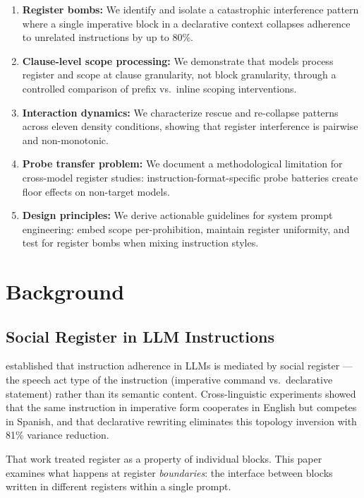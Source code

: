 \documentclass[11pt,a4paper]{article}
\begin{document}
\begin{enumerate}[leftmargin=*]
\item \textbf{Register bombs:} We identify and isolate a catastrophic
interference pattern where a single imperative block in a declarative
context collapses adherence to unrelated instructions by up to 80\%.

\item \textbf{Clause-level scope processing:} We demonstrate that
models process register and scope at clause granularity, not block
granularity, through a controlled comparison of prefix vs.\ inline
scoping interventions.

\item \textbf{Interaction dynamics:} We characterize rescue and
re-collapse patterns across eleven density conditions, showing that
register interference is pairwise and non-monotonic.

\item \textbf{Probe transfer problem:} We document a methodological
limitation for cross-model register studies: instruction-format-specific
probe batteries create floor effects on non-target models.

\item \textbf{Design principles:} We derive actionable guidelines for
system prompt engineering: embed scope per-prohibition, maintain register
uniformity, and test for register bombs when mixing instruction styles.
\end{enumerate}

\section{Background}

\subsection{Social Register in LLM Instructions}

\citet{mason2026register} established that instruction adherence in
LLMs is mediated by social register --- the speech act type of the
instruction (imperative command vs.\ declarative statement) rather
than its semantic content. Cross-linguistic experiments showed that
the same instruction in imperative form cooperates in English but
competes in Spanish, and that declarative rewriting eliminates this
topology inversion with 81\% variance reduction.

That work treated register as a property of individual blocks. This
paper examines what happens at register \emph{boundaries}: the
interface between blocks written in different registers within a
single prompt.
\end{document}
